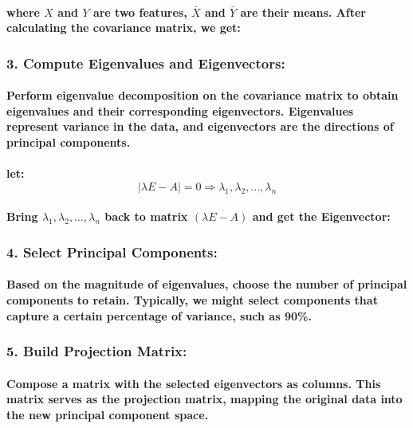 \paragraph{where \(X\) and \(Y\) are two features, \(\bar{X}\) and \(\bar{Y}\) are their means. After calculating the covariance matrix, we get:}
% 
% 
% 
% 
% 
% 
% 
% 
% 
\subsubsection*{3. Compute Eigenvalues and Eigenvectors:}
% 
\paragraph{Perform eigenvalue decomposition on the covariance matrix to obtain eigenvalues and their corresponding eigenvectors. Eigenvalues represent variance in the data, and eigenvectors are the directions of principal components.}
\paragraph{let: $$|\lambda E - A| = 0 \Rightarrow \lambda_1,\lambda_2,...,\lambda_n$$}
% 
\paragraph{Bring $\lambda_1,\lambda_2,...,\lambda_n$ back to matrix $(\lambda E - A)$ and get the Eigenvector:}
% 
\subsubsection*{4. Select Principal Components:}
% 
\paragraph{Based on the magnitude of eigenvalues, choose the number of principal components to retain. Typically, we might select components that capture a certain percentage of variance, such as 90\%.}
% 
\subsubsection*{5. Build Projection Matrix:}
% 
\paragraph{Compose a matrix with the selected eigenvectors as columns. This matrix serves as the projection matrix, mapping the original data into the new principal component space.}
% 

